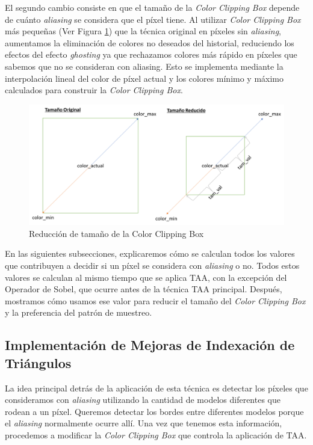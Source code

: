 \documentclass[pregrado]{tesis-usb} %
\begin{document}
El segundo cambio consiste en que el tamaño de la \textit{Color Clipping Box} depende de cuánto \textit{aliasing} se considera que el píxel tiene. Al utilizar \textit{Color Clipping Box} más pequeñas (Ver Figura \ref{fig:colorclippingboxredux}) que la técnica original en píxeles sin \textit{aliasing}, aumentamos la eliminación de colores no deseados del historial, reduciendo los efectos del efecto \textit{ghosting} ya que rechazamos colores más rápido en píxeles que sabemos que no se consideran con aliasing. Esto se implementa mediante la interpolación lineal del color de píxel actual y los colores mínimo y máximo calculados para construir la \textit{Color Clipping Box}.

\begin{figure}[!hbt]
	\centering
	\includegraphics[scale=0.3]{images/clipping_box_reduction.png}
	\caption{Reducción de tamaño de la Color Clipping Box}\label{fig:colorclippingboxredux}
\end{figure}

En las siguientes subsecciones, explicaremos cómo se calculan todos los valores que contribuyen a decidir si un píxel se considera con \textit{aliasing} o no. Todos estos valores se calculan al mismo tiempo que se aplica TAA, con la excepción del Operador de Sobel, que ocurre antes de la técnica TAA principal. Después, mostramos cómo usamos ese valor para reducir el tamaño del \textit{Color Clipping Box} y la preferencia del patrón de muestreo.

\subsection{Implementación de Mejoras de Indexación de Triángulos}
La idea principal detrás de la aplicación de esta técnica es detectar los píxeles que consideramos con \textit{aliasing} utilizando la cantidad de modelos diferentes que rodean a un píxel. Queremos detectar los bordes entre diferentes modelos porque el \textit{aliasing} normalmente ocurre allí. Una vez que tenemos esta información, procedemos a modificar la \textit{Color Clipping Box} que controla la aplicación de TAA.
\end{document}
